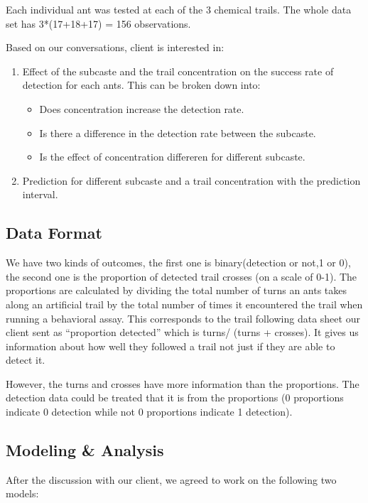 \documentclass{article}
\begin{document}
	Each individual ant was tested at each of the 3 chemical trails. The whole data set has 3*(17+18+17) = 156 observations. 

	Based on our conversations, client is interested in:
	\begin{enumerate}
		\item Effect of the subcaste and the trail concentration on the success rate of detection for each ants. This can be broken down into:
		\begin{itemize}
			\item Does concentration increase the detection rate.
			\item Is there a difference in the detection rate between the subcaste.
			\item Is the effect of concentration differeren for different subcaste.
		\end{itemize}
		\item Prediction for different subcaste and a trail concentration with the prediction interval.
	\end{enumerate}
	
	\subsection{Data Format}
	We have two kinds of outcomes, the first one is binary(detection or not,1 or 0), the second one is the proportion of detected trail crosses (on a scale of 0-1). The proportions are calculated by dividing the total number of turns an ants takes along an artificial trail by the total number of times it encountered the trail when running a behavioral assay. This corresponds to the trail following data sheet our client sent as “proportion detected” which is turns/ (turns + crosses). It gives us information about how well they followed a trail not just if they are able to detect it. 
	
	However, the turns and crosses have more information than the proportions. The detection data could be treated that it is from the proportions (0 proportions indicate 0 detection while not 0 proportions indicate 1 detection).
	
	

	\subsection{Modeling \& Analysis}
	After the discussion with our client, we agreed to work on the following two models:  \\
	 
\end{document}
